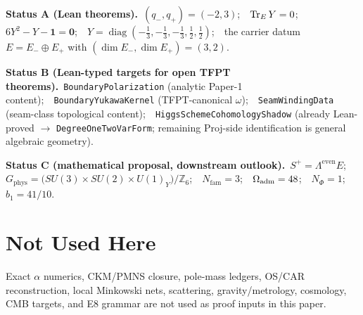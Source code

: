 \documentclass[11pt,a4paper]{article}
\begin{document}
\begin{tfptexports}
\textbf{Status A (Lean theorems).}\ $(q_-, q_+) = (-2, 3)$;\ \ $\operatorname{Tr}_E Y = 0$;\ \
$6 Y^2 - Y - \mathbf 1 = \mathbf 0$;\ \
$Y = \operatorname{diag}(-\tfrac13,-\tfrac13,-\tfrac13,\tfrac12,\tfrac12)$;\ \ the carrier datum
$E = E_- \oplus E_+$ with $(\dim E_-, \dim E_+) = (3, 2)$.

\smallskip
\textbf{Status B (Lean-typed targets for open TFPT theorems).}\
\texttt{BoundaryPolarization} (analytic Paper-1 content);\ \
\texttt{BoundaryYukawaKernel} (TFPT-canonical $\omega$);\ \
\texttt{SeamWindingData} (seam-class topological content);\ \
\texttt{HiggsSchemeCohomologyShadow} (already Lean-proved $\to$ \texttt{DegreeOneTwoVarForm};
remaining Proj-side identification is general algebraic geometry).

\smallskip
\textbf{Status C (mathematical proposal, downstream outlook).}\
$S^+ = \Lambda^{\mathrm{even}} E$;\ \
$G_{\mathrm{phys}} = \big(SU(3)\times SU(2)\times U(1)_Y\big) / \mathbb Z_6$;\ \
$N_{\mathrm{fam}} = 3$;\ \ $\Omega_{\mathrm{adm}} = 48$;\ \ $N_\Phi = 1$;\ \ $b_1 = 41/10$.
\end{tfptexports}

\section{Not Used Here}

Exact $\alpha$ numerics, CKM/PMNS closure, pole-mass ledgers, OS/CAR reconstruction, local
Minkowski nets, scattering, gravity/metrology, cosmology, CMB targets, and E8 grammar are not used
as proof inputs in this paper.
\end{document}
